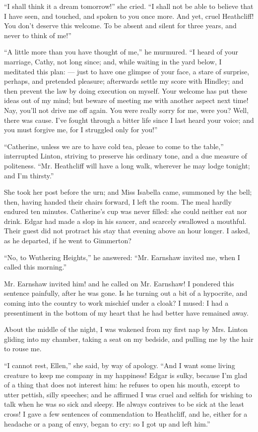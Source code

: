 \par “I shall think it a dream tomorrow!” she cried. “I shall not be able to believe that I have seen, and touched, and spoken to you once more. And yet, cruel Heathcliff! You don't deserve this welcome. To be absent and silent for three years, and never to think of me!”
\par “A little more than you have thought of me,” he murmured. “I heard of your marriage, Cathy, not long since; and, while waiting in the yard below, I meditated this plan: — just to have one glimpse of your face, a stare of surprise, perhaps, and pretended pleasure; afterwards settle my score with Hindley; and then prevent the law by doing execution on myself. Your welcome has put these ideas out of my mind; but beware of meeting me with another aspect next time! Nay, you'll not drive me off again. You were really sorry for me, were you? Well, there was cause. I've fought through a bitter life since I last heard your voice; and you must forgive me, for I struggled only for you!”
\par “Catherine, unless we are to have cold tea, please to come to the table,” interrupted Linton, striving to preserve his ordinary tone, and a due measure of politeness. “Mr. Heathcliff will have a long walk, wherever he may lodge tonight; and I'm thirsty.”
\par She took her post before the urn; and Miss Isabella came, summoned by the bell; then, having handed their chairs forward, I left the room. The meal hardly endured ten minutes. Catherine's cup was never filled: she could neither eat nor drink. Edgar had made a slop in his saucer, and scarcely swallowed a mouthful. Their guest did not protract his stay that evening above an hour longer. I asked, as he departed, if he went to Gimmerton?
\par “No, to Wuthering Heights,” he answered: “Mr. Earnshaw invited me, when I called this morning.”
\par Mr. Earnshaw invited him! and he called on Mr. Earnshaw! I pondered this sentence painfully, after he was gone. Is he turning out a bit of a hypocrite, and coming into the country to work mischief under a cloak? I mused: I had a presentiment in the bottom of my heart that he had better have remained away.
\par About the middle of the night, I was wakened from my first nap by Mrs. Linton gliding into my chamber, taking a seat on my bedside, and pulling me by the hair to rouse me.
\par “I cannot rest, Ellen,” she said, by way of apology. “And I want some living creature to keep me company in my happiness! Edgar is sulky, because I'm glad of a thing that does not interest him: he refuses to open his mouth, except to utter pettish, silly speeches; and he affirmed I was cruel and selfish for wishing to talk when he was so sick and sleepy. He always contrives to be sick at the least cross! I gave a few sentences of commendation to Heathcliff, and he, either for a headache or a pang of envy, began to cry: so I got up and left him.”
